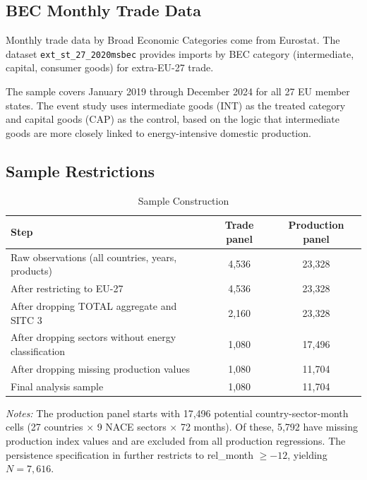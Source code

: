 \documentclass[12pt]{article}
\begin{document}
\subsection{BEC Monthly Trade Data}

Monthly trade data by Broad Economic Categories come from Eurostat. The dataset \texttt{ext\_st\_27\_2020msbec} provides imports by BEC category (intermediate, capital, consumer goods) for extra-EU-27 trade.

The sample covers January 2019 through December 2024 for all 27 EU member states. The event study uses intermediate goods (INT) as the treated category and capital goods (CAP) as the control, based on the logic that intermediate goods are more closely linked to energy-intensive domestic production.

\subsection{Sample Restrictions}

\begin{table}[H]
\centering
\caption{Sample Construction}
\label{tab:sample_construction}
\small
\begin{tabular}{lcc}
\toprule
Step & Trade panel & Production panel \\
\midrule
Raw observations (all countries, years, products) & 4,536 & 23,328 \\
After restricting to EU-27 & 4,536 & 23,328 \\
After dropping TOTAL aggregate and SITC 3 & 2,160 & 23,328 \\
After dropping sectors without energy classification & 1,080 & 17,496 \\
After dropping missing production values & 1,080 & 11,704 \\
\midrule
Final analysis sample & 1,080 & 11,704 \\
\bottomrule
\end{tabular}
\begin{tablenotes}[flushleft]
\small
\item \textit{Notes:} The production panel starts with 17,496 potential country-sector-month cells (27 countries $\times$ 9 NACE sectors $\times$ 72 months). Of these, 5,792 have missing production index values and are excluded from all production regressions. The persistence specification in  further restricts to rel\_month $\geq -12$, yielding $N = 7{,}616$.
\end{tablenotes}
\end{table}
\end{document}
